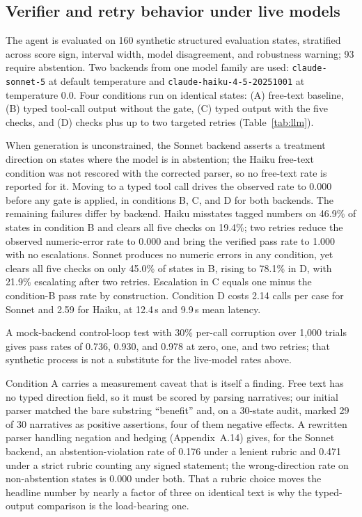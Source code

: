 \documentclass{article}
\begin{document}
\subsection{Verifier and retry behavior under live models}
The agent is evaluated on 160 synthetic structured evaluation states, stratified across score sign, interval width, model disagreement, and robustness warning; 93 require abstention. Two backends from one model family are used: \texttt{claude-sonnet-5} at default temperature and \texttt{claude-haiku-4-5-20251001} at temperature 0.0. Four conditions run on identical states: (A) free-text baseline, (B) typed tool-call output without the gate, (C) typed output with the five checks, and (D) checks plus up to two targeted retries (Table~\ref{tab:llm}).


When generation is unconstrained, the Sonnet backend asserts a treatment direction on states where the model is in abstention; the Haiku free-text condition was not rescored with the corrected parser, so no free-text rate is reported for it. Moving to a typed tool call drives the observed rate to 0.000 before any gate is applied, in conditions B, C, and D for both backends. The remaining failures differ by backend. Haiku misstates tagged numbers on 46.9\% of states in condition B and clears all five checks on 19.4\%; two retries reduce the observed numeric-error rate to 0.000 and bring the verified pass rate to 1.000 with no escalations. Sonnet produces no numeric errors in any condition, yet clears all five checks on only 45.0\% of states in B, rising to 78.1\% in D, with 21.9\% escalating after two retries. Escalation in C equals one minus the condition-B pass rate by construction. Condition D costs 2.14 calls per case for Sonnet and 2.59 for Haiku, at 12.4\,s and 9.9\,s mean latency.


A mock-backend control-loop test with 30\% per-call corruption over 1,000 trials gives pass rates of 0.736, 0.930, and 0.978 at zero, one, and two retries; that synthetic process is not a substitute for the live-model rates above.

Condition A carries a measurement caveat that is itself a finding. Free text has no typed direction field, so it must be scored by parsing narratives; our initial parser matched the bare substring ``benefit'' and, on a 30-state audit, marked 29 of 30 narratives as positive assertions, four of them negative effects. A rewritten parser handling negation and hedging (Appendix~A.14) gives, for the Sonnet backend, an abstention-violation rate of 0.176 under a lenient rubric and 0.471 under a strict rubric counting any signed statement; the wrong-direction rate on non-abstention states is 0.000 under both. That a rubric choice moves the headline number by nearly a factor of three on identical text is why the typed-output comparison is the load-bearing one.
\end{document}
